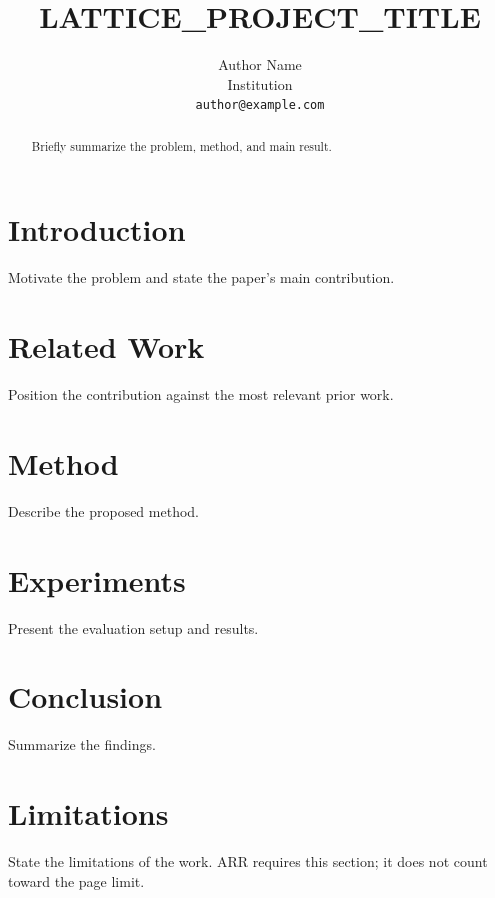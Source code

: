\documentclass[11pt]{article}
\title{LATTICE_PROJECT_TITLE}
\author{Author Name \\
  Institution \\
  \texttt{author@example.com}}
\begin{document}
\maketitle

\begin{abstract}
Briefly summarize the problem, method, and main result.
\end{abstract}

\section{Introduction}
Motivate the problem and state the paper's main contribution.

\section{Related Work}
Position the contribution against the most relevant prior work.

\section{Method}
Describe the proposed method.

\section{Experiments}
Present the evaluation setup and results.

\section{Conclusion}
Summarize the findings.

\section*{Limitations}
State the limitations of the work. ARR requires this section; it does not
count toward the page limit.


\end{document}
